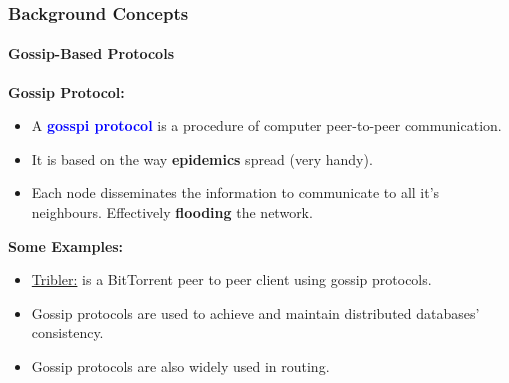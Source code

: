 \documentclass[10pt,    %
    english,            %
    xcolor=table,       %
    envcountsect,        %
    aspectratio=169     %
]{beamer}
\begin{document}
\begin{frame}
    \frametitle{Background Concepts}
    \framesubtitle{Gossip-Based Protocols}

    \textbf{Gossip Protocol:}
    \begin{itemize}
        \item A \textbf{\textcolor{blue}{gosspi protocol}} is a procedure of computer peer-to-peer communication.
        \item It is based on the way \textbf{epidemics} spread (very handy).
        \item Each node disseminates the information to communicate to all it's neighbours. Effectively \textbf{flooding} the network.
    \end{itemize}
    \textbf{Some Examples:}
    \begin{itemize}
        \item \href{https://en.wikipedia.org/wiki/Tribler}{Tribler:} is a BitTorrent peer to peer client using gossip protocols.
        \item Gossip protocols are used to achieve and maintain distributed databases' consistency.
        \item Gossip protocols are also widely used in routing.
    \end{itemize}

\end{frame}
\end{document}

